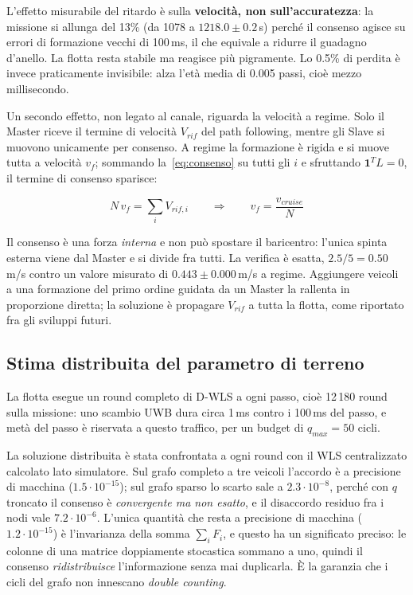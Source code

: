 \documentclass[conference,9pt]{IEEEtran}
\begin{document}
L'effetto misurabile del ritardo \`e sulla \textbf{velocit\`a, non
sull'accuratezza}: la missione si allunga del 13\% (da 1078 a
$1218.0 \pm 0.2$\,s) perch\'e
il consenso agisce su errori di formazione vecchi di 100\,ms, il che equivale a
ridurre il guadagno d'anello. La flotta resta stabile ma reagisce pi\`u
pigramente. Lo 0.5\% di perdita \`e invece praticamente invisibile: alza l'et\`a
media di 0.005 passi, cio\`e mezzo millisecondo.

Un secondo effetto, non legato al canale, riguarda la velocit\`a a regime. Solo
il Master riceve il termine di velocit\`a $V_{rif}$ del path following, mentre
gli Slave si muovono unicamente per consenso. A regime la formazione \`e rigida
e si muove tutta a velocit\`a $v_f$; sommando la~\eqref{eq:consenso} su tutti
gli $i$ e sfruttando $\mathbf{1}^T L = 0$, il termine di consenso sparisce:

\begin{equation}
N\,v_f = \sum_i V_{rif,i} \qquad\Longrightarrow\qquad
v_f = \frac{v_{cruise}}{N}
\label{eq:velflotta}
\end{equation}

Il consenso \`e una forza \emph{interna} e non pu\`o spostare il baricentro:
l'unica spinta esterna viene dal Master e si divide fra tutti. La verifica \`e
esatta, $2.5/5 = 0.50$\,m/s contro un valore misurato di
$0.443 \pm 0.000$\,m/s a regime. Aggiungere veicoli a una formazione del primo
ordine guidata da un Master la rallenta in proporzione diretta; la soluzione \`e
propagare $V_{rif}$ a tutta la flotta, come riportato fra gli sviluppi futuri.

\subsection{Stima distribuita del parametro di terreno}

La flotta esegue un round completo di D-WLS a ogni passo, cio\`e 12\,180 round
sulla missione: uno scambio UWB dura circa 1\,ms contro i 100\,ms del passo, e
met\`a del passo \`e riservata a questo traffico, per un budget di
$q_{max} = 50$ cicli.

La soluzione distribuita \`e stata confrontata a ogni round con il WLS
centralizzato calcolato lato simulatore. Sul grafo completo a tre veicoli
l'accordo \`e a precisione di macchina ($1.5\cdot10^{-15}$); sul grafo sparso lo
scarto sale a $2.3\cdot10^{-8}$, perch\'e con $q$ troncato il consenso \`e
\emph{convergente ma non esatto}, e il disaccordo residuo fra i nodi vale
$7.2\cdot10^{-6}$. L'unica quantit\`a che resta a precisione di macchina
($1.2\cdot10^{-15}$) \`e l'invarianza della somma $\sum_i F_i$, e questo ha un
significato preciso: le colonne di una matrice doppiamente stocastica sommano a
uno, quindi il consenso \emph{ridistribuisce} l'informazione senza mai
duplicarla. \`E la garanzia che i cicli del grafo non innescano
\emph{double counting}.
\end{document}
